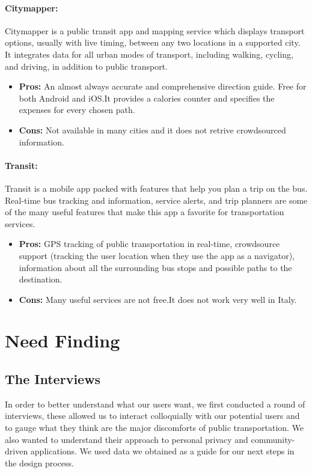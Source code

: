 \documentclass[a4paper, 11pt]{report}
\begin{document}
\paragraph{Citymapper:} Citymapper is a public transit app and mapping service which displays transport options, usually with live timing, between any two locations in a supported city. It integrates data for all urban modes of transport, including walking, cycling, and driving, in addition to public transport.

\begin{itemize}
	\item \textbf{Pros:} An almost always accurate and comprehensive direction guide. Free for both Android and iOS.\@ It provides a calories counter and 	specifies the expenses for every chosen path.
	\item \textbf{Cons:} Not available in many cities and it does not retrive crowdsourced information.
\end{itemize}

\paragraph{Transit:}  Transit is a mobile app packed with features that help you plan a trip on the bus. Real-time bus tracking and information, service alerts, and trip planners are some of the many useful features that make this app a favorite for transportation services.

\begin{itemize}
	\item \textbf{Pros:} GPS tracking of public transportation in real-time, crowdsource support (tracking the user location when they use the app as a navigator), information about all the surrounding bus stops and possible paths to the destination.
	\item \textbf{Cons:} Many useful services are not free.\@ It does not work very well in Italy.
\end{itemize}

\section{Need Finding}\label{sec:need-finding}

\subsection{The Interviews}\label{ssec:the-interviews}

In order to better understand what our users want, we first conducted a round of interviews,
these allowed us to interact colloquially with our potential users and to gauge what they think
are the major discomforts of public transportation. We also wanted to understand their approach
to personal privacy and community-driven applications. We used data we obtained as a guide for our
next steps in the design process.
\end{document}
